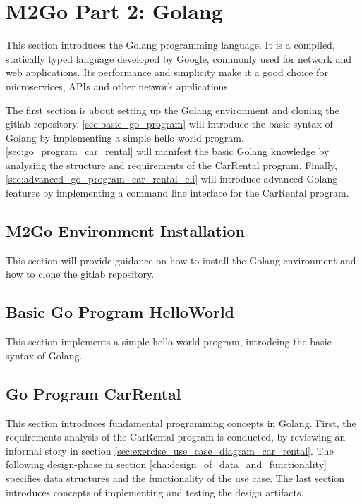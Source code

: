 \chapter{M2Go Part 2: Golang}
\label{cha:golang}
This section introduces the Golang programming language.
It is a compiled, statically typed language developed by Google, commonly used for network and web applications.
Its performance and simplicity make it a good choice for microservices, APIs and other network applications.

The first section is about setting up the Golang environment and cloning the gitlab repository.
\autoref{sec:basic_go_program} will introduce the basic syntax of Golang by implementing a simple hello world program.
\autoref{sec:go_program_car_rental} will manifest the basic Golang knowledge by analysing the structure and requirements of the CarRental program.
Finally, \autoref{sec:advanced_go_program_car_rental_cli} will introduce advanced Golang features by implementing a command line interface for the CarRental program.


\section{M2Go Environment Installation}
\label{sec:m2go_env_installation}
This section will provide guidance on how to install the Golang environment and how to clone the gitlab repository.





\section{Basic Go Program HelloWorld}
\label{sec:basic_go_program}
This section implements a simple hello world program, introdcing the basic syntax of Golang.




\section{Go Program CarRental}
\label{sec:go_program_car_rental}
This section introduces fundamental programming concepts in Golang.
First, the requirements analysis of the CarRental program is conducted, by reviewing an informal story in section \ref{sec:exercise_use_case_diagram_car_rental}.
The following design-phase in section \ref{cha:design_of_data_and_functionality} specifies data structures and the functionality of the use case.
The last section introduces concepts of implementing and testing the design artifacts.


